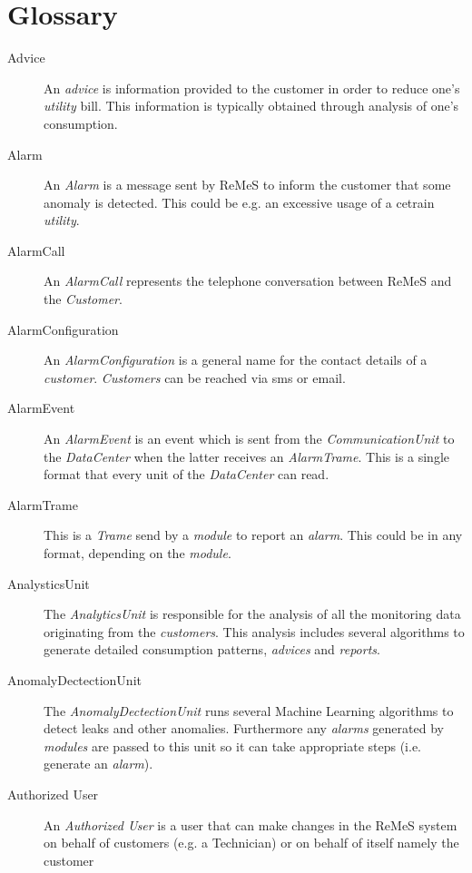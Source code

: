 \chapter{Glossary}
\label{chap:glossary}

\begin{description}
\item[Advice] An \emph{advice} is information provided to the customer in order
to reduce one's \emph{utility} bill. This information is typically obtained through
analysis of one's consumption.

\item[Alarm] An \emph{Alarm} is a message sent by ReMeS to inform the customer
that some anomaly is detected. This could be e.g. an excessive usage of a cetrain
\emph{utility}.

\item[AlarmCall] An \emph{AlarmCall} represents the telephone conversation
between ReMeS and the \emph{Customer}.

\item[AlarmConfiguration] An \emph{AlarmConfiguration} is a general name for the
contact details of a \emph{customer}. \emph{Customers} can be reached via sms or
email.

\item[AlarmEvent] An \emph{AlarmEvent} is an event which is sent from the
\emph{CommunicationUnit} to the \emph{DataCenter} when the latter receives an
\emph{AlarmTrame}. This is a single format that every unit of the
\emph{DataCenter} can read.

\item[AlarmTrame] This is a \emph{Trame} send by a \emph{module} to report an
\emph{alarm}. This could be in any format, depending on the \emph{module}.

\item[AnalysticsUnit] The \emph{AnalyticsUnit} is responsible for the analysis
of all the monitoring data originating from the \emph{customers}. This analysis
includes several algorithms to generate detailed consumption patterns,
\emph{advices} and \emph{reports}. 

\item[AnomalyDectectionUnit] The \emph{AnomalyDectectionUnit} runs several
Machine Learning algorithms to detect leaks and other anomalies. Furthermore any
\emph{alarms} generated by \emph{modules} are passed to this unit so it can take
appropriate steps (i.e. generate an \emph{alarm}).

\item[Authorized User] An \emph{Authorized User} is a user that can make changes
in the ReMeS system on behalf of  customers (e.g. a Technician) or on
behalf of itself namely the customer %


\end{description}
